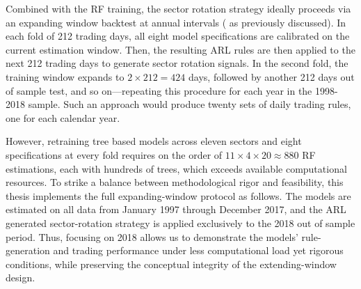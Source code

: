 Combined with the RF training, the sector rotation strategy ideally proceeds via an expanding window backtest at annual intervals ( as previously discussed). In each fold of 212 trading days, all eight model specifications are calibrated on the current estimation window. Then, the resulting ARL rules are then applied to the next 212 trading days to generate sector rotation signals. In the second fold, the training window expands to $2\times212=424$ days, followed by another 212 days out of sample test, and so on—repeating this procedure for each year in the 1998-2018 sample. Such an approach would produce twenty sets of daily trading rules, one for each calendar year.

However, retraining tree based models across eleven sectors and eight specifications at every fold requires on the order of $11\times4\times20\approx880$ RF estimations, each with hundreds of trees, which exceeds available computational resources. To strike a balance between methodological rigor and feasibility, this thesis implements the full expanding-window protocol as follows. The models are estimated on all data from January 1997 through December 2017, and the ARL generated sector-rotation strategy is applied exclusively to the 2018 out of sample period. Thus, focusing on 2018 allows us to demonstrate the models' rule-generation and trading performance under less computational load yet rigorous conditions, while preserving the conceptual integrity of the extending-window design.








